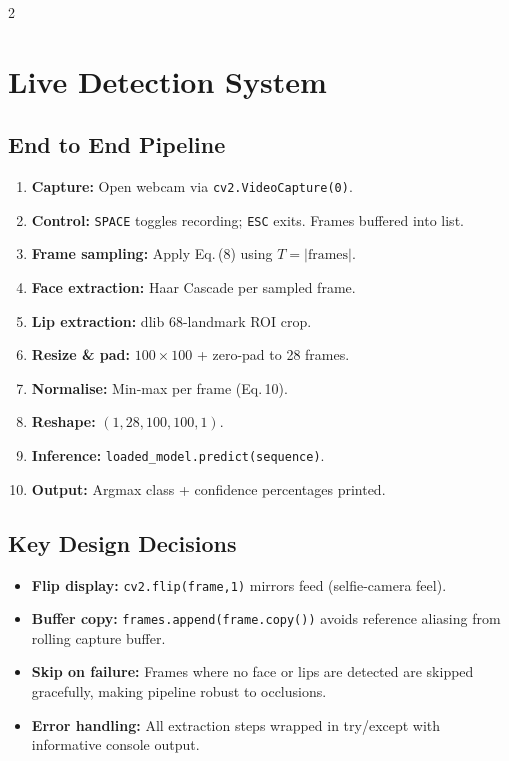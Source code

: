 \documentclass[10pt, a4paper]{article}
\begin{document}
\begin{multicols}{2}
\columnbreak
\section{Live Detection System}

\subsection{End to End Pipeline}

\begin{enumerate}
  \item \textbf{Capture:} Open webcam via \texttt{cv2.VideoCapture(0)}.
  \item \textbf{Control:} \texttt{SPACE} toggles recording; \texttt{ESC}
        exits. Frames buffered into list.
  \item \textbf{Frame sampling:} Apply Eq.\,(8) using $T = |\text{frames}|$.
  \item \textbf{Face extraction:} Haar Cascade per sampled frame.
  \item \textbf{Lip extraction:} dlib 68-landmark ROI crop.
  \item \textbf{Resize \& pad:} $100 \times 100$ + zero-pad to 28 frames.
  \item \textbf{Normalise:} Min-max per frame (Eq.\,10).
  \item \textbf{Reshape:} $(1, 28, 100, 100, 1)$.
  \item \textbf{Inference:} \texttt{loaded\_model.predict(sequence)}.
  \item \textbf{Output:} Argmax class + confidence percentages printed.
\end{enumerate}

\subsection{Key Design Decisions}
\begin{itemize}
  \item \textbf{Flip display:} \texttt{cv2.flip(frame,1)} mirrors feed
        (selfie-camera feel).
  \item \textbf{Buffer copy:} \texttt{frames.append(frame.copy())} avoids
        reference aliasing from rolling capture buffer.
  \item \textbf{Skip on failure:} Frames where no face or lips are detected
        are skipped gracefully, making pipeline robust to occlusions.
  \item \textbf{Error handling:} All extraction steps wrapped in try/except
        with informative console output.
\end{itemize}


\end{multicols}
\end{document}
